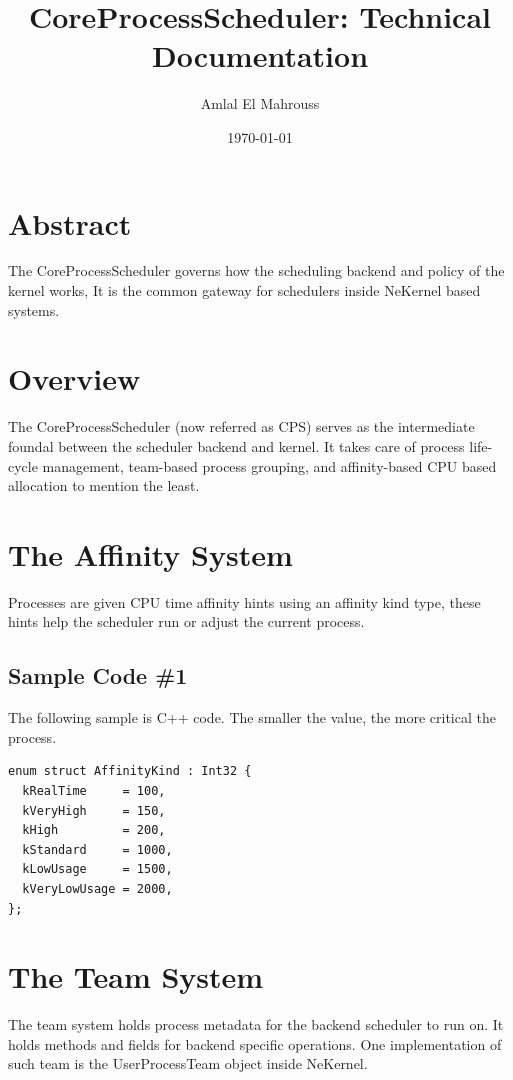 \documentclass{article}
\title{CoreProcessScheduler: Technical Documentation}
\author{Amlal El Mahrouss}
\date{\today}
\begin{document}
\maketitle

\section{Abstract}

{The CoreProcessScheduler governs how the scheduling backend and policy of the kernel works, It is the common gateway for schedulers inside NeKernel based systems.}

\section{Overview}

{The CoreProcessScheduler (now referred as CPS) serves as the intermediate foundal between the scheduler backend and kernel.} {It takes care of process life-cycle management, team-based process grouping, and affinity-based CPU based allocation to mention the least.}

\section{The Affinity System}

{Processes are given CPU time affinity hints using an affinity kind type, these hints help the scheduler run or adjust the current process.}

\subsection{Sample Code \#1}

{The following sample is C++ code.} {The smaller the value, the more critical the process.}

\begin{verbatim}
enum struct AffinityKind : Int32 {
  kRealTime     = 100,
  kVeryHigh     = 150,
  kHigh         = 200,
  kStandard     = 1000,
  kLowUsage     = 1500,
  kVeryLowUsage = 2000,
};
\end{verbatim}

\section{The Team System}

{The team system holds process metadata for the backend scheduler to run on. It holds methods and fields for backend specific operations.} {One implementation of such team is the UserProcessTeam object inside NeKernel.}
\end{document}
